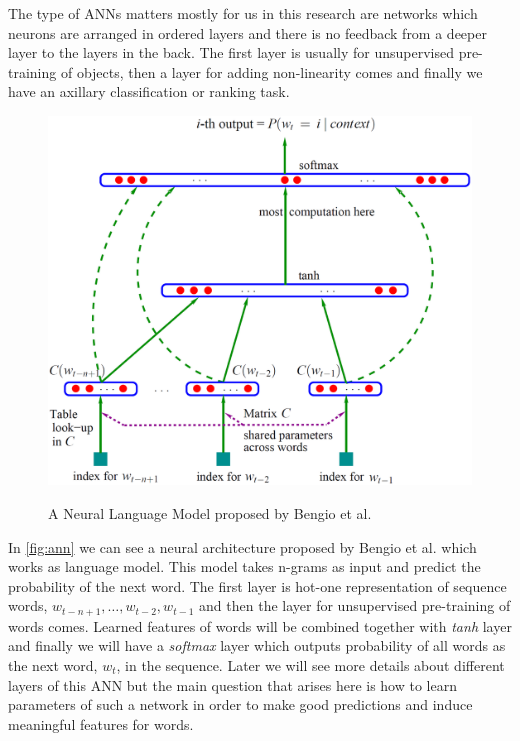 The type of ANNs matters mostly for us in this research are
networks which neurons are arranged in ordered layers and there is no feedback
from a deeper layer  to the layers in the back. The first layer is usually for
unsupervised pre-training of objects, then a layer for adding non-linearity
comes and finally we have an axillary classification or ranking task.\cite{Bengio2003}
 \begin{figure}[h!]
  \caption{A Neural Language Model proposed by Bengio et al.}
  \centering
    \includegraphics[width=1\textwidth]{ann.eps}
    \label{fig:ann}
\end{figure} 
 In \autoref{fig:ann}
 we can see a neural architecture proposed by Bengio et al. \cite{Bengio2003}
 which works as language model. This model takes n-grams as input and predict
 the probability of the next word. The first layer is hot-one representation of
 sequence words, $w_{t-n+1}, \ldots ,w_{t-2}, w_{t-1}$ and then the layer for
 unsupervised pre-training of words comes.
 Learned features of words will be combined together with \textit{tanh} layer
 and finally we will have a \textit{softmax} layer which outputs probability of
 all words as the next word, $w_t$, in the sequence. Later we will see more details about 
 different layers of this ANN but
 the main question that arises here is how to learn parameters of such a network
 in order to make good predictions and induce meaningful features for words.

